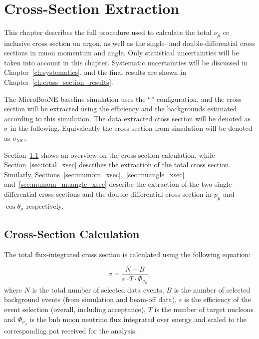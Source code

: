 \chapter{Cross-Section Extraction}
\label{ch:extraction}



This chapter describes the full procedure used to calculate the total $\nu_\mu$ \acrshort{cc} inclusive cross section on argon, as well as the single- and double-differential cross sections in muon momentum and angle. Only statistical uncertainties will be taken into account in this chapter. Systematic uncertainties will be discussed in Chapter~\ref{ch:systematics}, and the final results are shown in Chapter~\ref{ch:cross_section_results}. 

The MicroBooNE baseline simulation uses the ``\tuneone'' configuration, and the cross section will be extracted using the efficiency and the backgrounds estimated according to this simulation. The data extracted cross section will be denoted as $\sigma$ in the following. Equivalently the cross section from simulation will be denoted as $\sigma_\text{MC}$. 

Section~\ref{sec:xsec_calculation} shows an overview on the cross section calculation, while Section~\ref{sec:total_xsec} describes the extraction of the total cross section. Similarly, Sections~\ref{sec:mumom_xsec},~\ref{sec:muangle_xsec} and~\ref{sec:mumom_muangle_xsec} describe the extraction of the two single-differential cross sections and the double-differential cross section in $p_\mu$ and $\cos\theta_\mu$ respectively.

\section{Cross-Section Calculation}
\label{sec:xsec_calculation}

The total flux-integrated cross section is calculated using the following equation:

\begin{equation}
\label{eq:xsec_total}
\sigma = \frac{N - B}{\epsilon \cdot T \cdot \Phi_{\nu_\mu}},
\end{equation}
where $N$ is the total number of selected data events, $B$ is the number of selected background events (from simulation and beam-off data), $\epsilon$ is the efficiency of the event selection (overall, including acceptance), $T$ is the number of target nucleons and $\Phi_{\nu_\mu}$ is the \acrshort{bnb} muon neutrino flux integrated over energy and scaled to the corresponding \acrshort{pot} received for the analysis.

